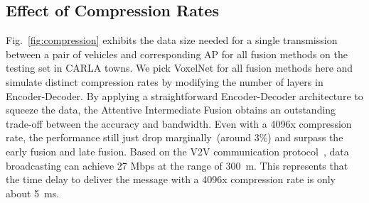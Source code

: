 \documentclass[letterpaper, 10 pt, conference]{ieeeconf}  %
\begin{document}
\subsection{Effect of Compression Rates}
Fig.~\ref{fig:compression} exhibits the data size needed for a single transmission between a pair of vehicles and corresponding AP for all fusion methods on the testing set in CARLA towns. We pick VoxelNet for all fusion methods here and simulate distinct compression rates by modifying the number of layers in Encoder-Decoder. By applying a straightforward Encoder-Decoder architecture to squeeze the data, the Attentive Intermediate Fusion obtains an outstanding trade-off between the accuracy and bandwidth. Even with a 4096x compression rate, the performance still just drop marginally~(around 3\%) and surpass the early fusion and late fusion. Based on the V2V communication protocol~\cite{arena2019overview}, data broadcasting can achieve 27 Mbps at the range of 300~m. This represents that the time delay to deliver the message with a 4096x compression rate is only about 5~ms. 

        
        
\end{document}
